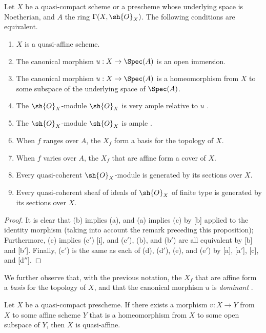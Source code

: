 \begin{proposition}[5.1.2]
\label{II.5.1.2}
Let $X$ be a quasi-compact scheme or a prescheme whose underlying space is Noetherian, and $A$ the ring $\Gamma(X,\sh{O}_X)$.
The following conditions are equivalent.
\begin{enumerate}
  \item[{\rm(a)}] $X$ is a quasi-affine scheme.
  \item[{\rm(b)}] The canonical morphism $u:X\to\Spec(A)$ is an open immersion.
  \item[{\rm(b')}] The canonical morphism $u:X\to\Spec(A)$ is a homeomorphism from $X$ to some subspace of the underlying space of $\Spec(A)$.
  \item[{\rm(c)}] The $\sh{O}_X$-module $\sh{O}_X$ is very ample relative to $u$ .
  \item[{\rm(c')}] The $\sh{O}_X$-module $\sh{O}_X$ is ample .
  \item[{\rm(d)}] When $f$ ranges over $A$, the $X_f$ form a basis for the topology of $X$.
  \item[{\rm(d')}] When $f$ varies over $A$, the $X_f$ that are affine form a cover of $X$.
  \item[{\rm(e)}] Every quasi-coherent $\sh{O}_X$-module is generated by its sections over $X$.
  \item[{\rm(e')}] Every quasi-coherent sheaf of ideals of $\sh{O}_X$ of finite type is generated by its sections over $X$.
\end{enumerate}
\end{proposition}

\begin{proof}
It is clear that (b) implies (a), and (a) implies (c) by [b] applied to the identity morphism (taking into account the remark preceding this proposition);
Furthermore, (c) implies (c$'$) [i], and (c$'$), (b), and (b$'$) are all equivalent by [b] and [b$'$].
Finally, (c$'$) is the same as each of (d), (d$'$), (e), and (e$'$) by [a], [a$'$], [c], and [d$''$].
\end{proof}

We further observe that, with the previous notation, the $X_f$ that are affine form a \emph{basis} for the topology of $X$, and that the canonical morphism $u$ is \emph{dominant} .

\begin{corollary}[5.1.3]
\label{II.5.1.3}
Let $X$ be a quasi-compact prescheme.
If there exists a morphism $v:X\to Y$ from $X$ to some affine scheme $Y$ that is a homeomorphism from $X$ to some open subspace of $Y$, then $X$ is quasi-affine.
\end{corollary}

